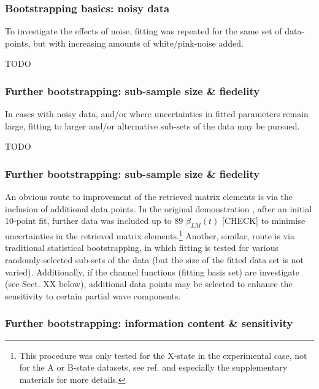 \subsubsection{Bootstrapping basics: noisy data}

To investigate the effects of noise, fitting was repeated for the same set of data-points, but with increasing amounts of white/pink-noise added.

TODO

\subsubsection{Further bootstrapping: sub-sample size \& fiedelity}

In cases with noisy data, and/or where uncertainties in fitted parameters remain large, fitting to larger and/or alternative sub-sets of the data may be pursued.

TODO

\subsubsection{Further bootstrapping: sub-sample size \& fiedelity}

An obvious route to improvement of the retrieved matrix elements is via the inclusion of additional data points. In the original demonstration \cite{marceau2017MolecularFrameReconstruction}, after an initial 10-point fit, further data was included up to 89 $\beta_{LM}(t)$ [CHECK] to minimise uncertainties in the retrieved matrix elements.\footnote{This procedure was only tested for the X-state in the experimental case, not for the A or B-state datasets, see ref. %
and especially the supplementary materials for more details.} Another, similar, route is via traditional statistical bootstrapping, in which fitting is tested for various randomly-selected sub-sets of the data (but the size of the fitted data set is not varied). Additionally, if the channel functions (fitting basis set) are investigate (see Sect. XX below), additional data points may be selected to enhance the sensitivity to certain partial wave components.




\subsubsection{Further bootstrapping: information content \& sensitivity}

